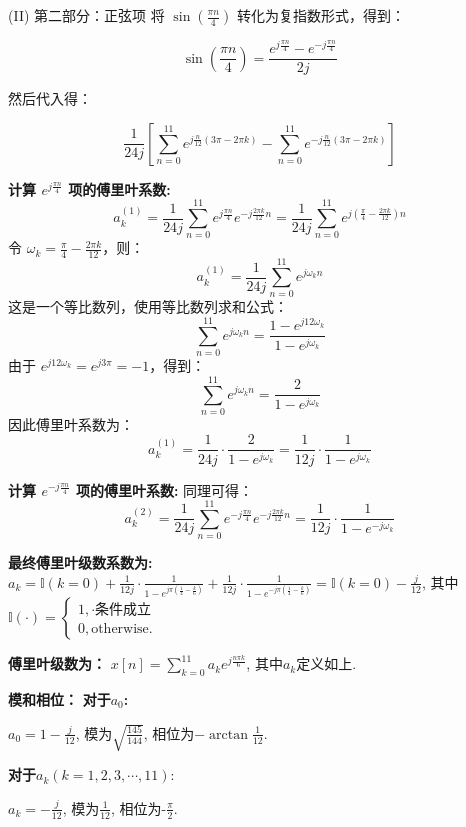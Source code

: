 \documentclass[a4paper,UTF8]{article}
\numberwithin{equation}{section}
\begin{document}
\begin{framed}
\begin{enumerate}[(1)]
      	 (II) 第二部分：正弦项
      	将 $\sin\left(\frac{\pi n}{4}\right)$ 转化为复指数形式，得到：
      	
      	\[
      	\sin\left(\frac{\pi n}{4}\right) = \frac{e^{j \frac{\pi n}{4}} - e^{-j \frac{\pi n}{4}}}{2j}
      	\]
      	
      	然后代入得：
      	
      	\[
      	\frac{1}{24j} \left[ \sum_{n=0}^{11} e^{j \frac{n}{12} (3\pi - 2\pi k)} - \sum_{n=0}^{11} e^{-j \frac{n}{12} (3\pi - 2\pi k)} \right]
      	\]
      	
      	\textbf{计算 \( e^{j \frac{\pi n}{4}} \) 项的傅里叶系数:}
      	\[
      	a_k^{(1)} = \frac{1}{24j} \sum_{n=0}^{11} e^{j \frac{\pi n}{4}} e^{-j \frac{2\pi k}{12} n} = \frac{1}{24j} \sum_{n=0}^{11} e^{j \left( \frac{\pi}{4} - \frac{2\pi k}{12} \right) n}
      	\]
      	令 \( \omega_k = \frac{\pi}{4} - \frac{2\pi k}{12} \)，则：
      	\[
      	a_k^{(1)} = \frac{1}{24j} \sum_{n=0}^{11} e^{j \omega_k n}
      	\]
      	这是一个等比数列，使用等比数列求和公式：
      	\[
      	\sum_{n=0}^{11} e^{j \omega_k n} = \frac{1 - e^{j 12 \omega_k}}{1 - e^{j \omega_k}}
      	\]
      	由于 \( e^{j 12 \omega_k} = e^{j 3\pi} = -1 \)，得到：
      	\[
      	\sum_{n=0}^{11} e^{j \omega_k n} = \frac{2}{1 - e^{j \omega_k}}
      	\]
      	因此傅里叶系数为：
      	\[
      	a_k^{(1)} = \frac{1}{24j} \cdot \frac{2}{1 - e^{j \omega_k}} = \frac{1}{12j} \cdot \frac{1}{1 - e^{j \omega_k}}
      	\]
      	
      	\textbf{计算 \( e^{-j \frac{\pi n}{4}} \) 项的傅里叶系数:}
      	同理可得：
      	\[
      	a_k^{(2)} = \frac{1}{24j} \sum_{n=0}^{11} e^{-j \frac{\pi n}{4}} e^{-j \frac{2\pi k}{12} n} = \frac{1}{12j} \cdot \frac{1}{1 - e^{-j \omega_k}}
      	\]
      	
      	
      	\textbf{最终傅里叶级数系数为:}
      $a_k = \mathbb{I}(k = 0) + \frac{1}{12j}\cdot\frac{1}{1-e^{j\pi(\frac{1}{4}-\frac{k}{6})}} +\frac{1}{12j}\cdot\frac{1}{1-e^{-j\pi(\frac{1}{4}-\frac{k}{6})}} = \mathbb{I}(k = 0) - \frac{j}{12} $, 其中$\mathbb{I}(\cdot) = \begin{cases}
      	1, \cdot\text{条件成立}\\
      	0, \text{otherwise}.
      \end{cases}$
      	
      	\textbf{傅里叶级数为：}
      	$x[n] = \sum\limits_{k=0}^{11}a_ke^{j\frac{n\pi k}{6}}$, 其中$a_k$定义如上.
      	
      	\textbf{模和相位：}
      \textbf{对于$a_0$:}
      
      $a_0 = 1 - \frac{j}{12}$, 模为$\sqrt{\frac{145}{144}}$, 相位为$-\arctan\frac{1}{12}.$
      
      \textbf{对于$a_k(k = 1,2,3,\cdots,11)$}:
      
      $a_k = -\frac{j}{12}$, 模为$\frac{1}{12}$, 相位为-$\frac{\pi}{2}$.
     
       
    \end{enumerate}
\end{framed}
\end{document}
